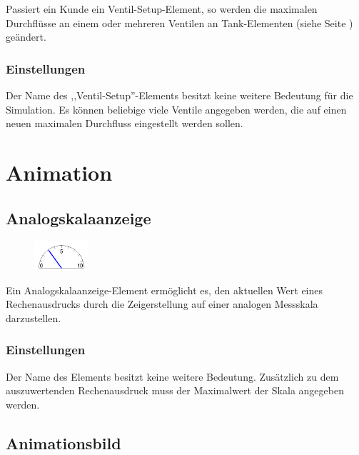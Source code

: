 Passiert ein Kunde ein Ventil-Setup-Element, so werden die maximalen Durchflüsse an einem
oder mehreren Ventilen an Tank-Elementen (siehe Seite \pageref{ref:ModelElementTank}) geändert.

\subsection*{Einstellungen}

Der Name des ,,Ventil-Setup''-Elements besitzt keine weitere Bedeutung für die Simulation.
Es können beliebige viele Ventile angegeben werden, die auf einen neuen maximalen Durchfluss
eingestellt werden sollen.





\chapter{Animation}

\section{Analogskalaanzeige}
\label{ref:ModelElementAnimationPointerMeasuring}

\begin{figure}
\vspace{-22pt}
\includegraphics[width=2cm]{imageModelElementAnimationPointerMeasuring.png}
\vspace{-22pt}
\end{figure}

Ein Analogskalaanzeige-Element ermöglicht es, den aktuellen Wert eines Rechenausdrucks
durch die Zeigerstellung auf einer analogen Messskala darzustellen.

\subsection*{Einstellungen}

Der Name des Elements besitzt keine weitere Bedeutung.
Zusätzlich zu dem auszuwertenden Rechenausdruck muss
der Maximalwert der Skala angegeben werden.


\section{Animationsbild}
\label{ref:ModelElementAnimationImage}

